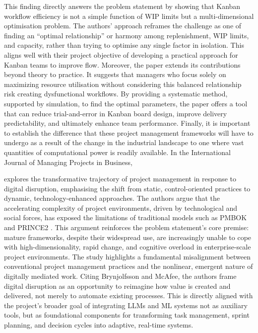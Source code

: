 \documentclass{report}
\begin{document}
This finding directly answers the problem statement by showing that Kanban workflow efficiency is not a simple function of WIP limits but a multi-dimensional optimisation problem. The authors’ approach reframes the challenge as one of finding an “optimal relationship” or harmony among replenishment, WIP limits, and capacity, rather than trying to optimise any single factor in isolation. This aligns well with their project objective of developing a practical approach for Kanban teams to improve flow.
Moreover, the paper extends its contributions beyond theory to practice. It suggests that managers who focus solely on maximizing resource utilisation without considering this balanced relationship risk creating dysfunctional workflows. By providing a systematic method, supported by simulation, to find the optimal parameters, the paper offers a tool that can reduce trial-and-error in Kanban board design, improve delivery predictability, and ultimately enhance team performance.
Finally, it is important to establish the difference that these project management frameworks will have to undergo as a result of the change in the industrial landscape to one where vast quantities of computational power is readily available. In the International Journal of Managing Projects in Business, \author{sonta-draczkowskaChallengesScalingAgile2024} explores the transformative trajectory of project management in response to digital disruption, emphasising the shift from static, control-oriented practices to dynamic, technology-enhanced approaches. The authors argue that the accelerating complexity of project environments, driven by technological and social forces, has exposed the limitations of traditional models such as PMBOK and PRINCE2 \parencite{sonta-draczkowskaChallengesScalingAgile2024}.
This argument reinforces the problem statement’s core premise: mature frameworks, despite their widespread use, are increasingly unable to cope with high-dimensionality, rapid change, and cognitive overload in enterprise-scale project environments.
The study highlights a fundamental misalignment between conventional project management practices and the nonlinear, emergent nature of digitally mediated work. Citing Brynjolfsson and McAfee, the authors frame digital disruption as an opportunity to reimagine how value is created and delivered, not merely to automate existing processes. This is directly aligned with the project’s broader goal of integrating LLMs and ML systems not as auxiliary tools, but as foundational components for transforming task management, sprint planning, and decision cycles into adaptive, real-time systems.
\end{document}
